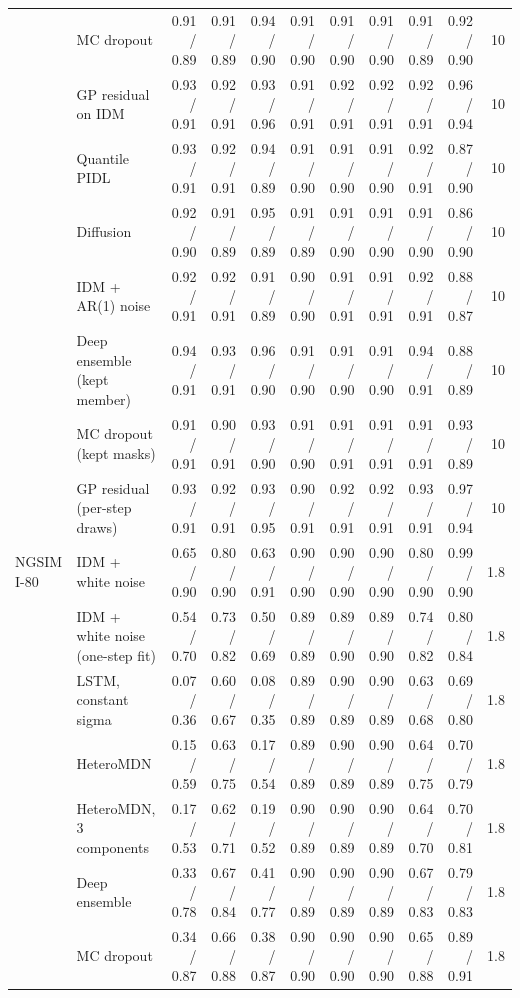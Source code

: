 \begin{longtable}{llrrrrrrrrr}
 & MC dropout & 0.91 / 0.89 & 0.91 / 0.89 & 0.94 / 0.90 & 0.91 / 0.90 & 0.91 / 0.90 & 0.91 / 0.90 & 0.91 / 0.89 & 0.92 / 0.90 & 10 \\
 & GP residual on IDM & 0.93 / 0.91 & 0.92 / 0.91 & 0.93 / 0.96 & 0.91 / 0.91 & 0.92 / 0.91 & 0.92 / 0.91 & 0.92 / 0.91 & 0.96 / 0.94 & 10 \\
 & Quantile PIDL & 0.93 / 0.91 & 0.92 / 0.91 & 0.94 / 0.89 & 0.91 / 0.90 & 0.91 / 0.90 & 0.91 / 0.90 & 0.92 / 0.91 & 0.87 / 0.90 & 10 \\
 & Diffusion & 0.92 / 0.90 & 0.91 / 0.89 & 0.95 / 0.89 & 0.91 / 0.89 & 0.91 / 0.90 & 0.91 / 0.90 & 0.91 / 0.90 & 0.86 / 0.90 & 10 \\
 & IDM + AR(1) noise & 0.92 / 0.91 & 0.92 / 0.91 & 0.91 / 0.89 & 0.90 / 0.90 & 0.91 / 0.91 & 0.91 / 0.91 & 0.92 / 0.91 & 0.88 / 0.87 & 10 \\
 & Deep ensemble (kept member) & 0.94 / 0.91 & 0.93 / 0.91 & 0.96 / 0.90 & 0.91 / 0.90 & 0.91 / 0.90 & 0.91 / 0.90 & 0.94 / 0.91 & 0.88 / 0.89 & 10 \\
 & MC dropout (kept masks) & 0.91 / 0.91 & 0.90 / 0.91 & 0.93 / 0.90 & 0.91 / 0.90 & 0.91 / 0.91 & 0.91 / 0.91 & 0.91 / 0.91 & 0.93 / 0.89 & 10 \\
 & GP residual (per-step draws) & 0.93 / 0.91 & 0.92 / 0.91 & 0.93 / 0.95 & 0.90 / 0.91 & 0.92 / 0.91 & 0.92 / 0.91 & 0.93 / 0.91 & 0.97 / 0.94 & 10 \\
\midrule
NGSIM I-80 & IDM + white noise & 0.65 / 0.90 & 0.80 / 0.90 & 0.63 / 0.91 & 0.90 / 0.90 & 0.90 / 0.90 & 0.90 / 0.90 & 0.80 / 0.90 & 0.99 / 0.90 & 1.8 \\
 & IDM + white noise (one-step fit) & 0.54 / 0.70 & 0.73 / 0.82 & 0.50 / 0.69 & 0.89 / 0.89 & 0.89 / 0.90 & 0.89 / 0.90 & 0.74 / 0.82 & 0.80 / 0.84 & 1.8 \\
 & LSTM, constant sigma & 0.07 / 0.36 & 0.60 / 0.67 & 0.08 / 0.35 & 0.89 / 0.89 & 0.90 / 0.89 & 0.90 / 0.89 & 0.63 / 0.68 & 0.69 / 0.80 & 1.8 \\
 & HeteroMDN & 0.15 / 0.59 & 0.63 / 0.75 & 0.17 / 0.54 & 0.89 / 0.89 & 0.90 / 0.89 & 0.90 / 0.89 & 0.64 / 0.75 & 0.70 / 0.79 & 1.8 \\
 & HeteroMDN, 3 components & 0.17 / 0.53 & 0.62 / 0.71 & 0.19 / 0.52 & 0.90 / 0.89 & 0.90 / 0.89 & 0.90 / 0.89 & 0.64 / 0.70 & 0.70 / 0.81 & 1.8 \\
 & Deep ensemble & 0.33 / 0.78 & 0.67 / 0.84 & 0.41 / 0.77 & 0.90 / 0.89 & 0.90 / 0.89 & 0.90 / 0.89 & 0.67 / 0.83 & 0.79 / 0.83 & 1.8 \\
 & MC dropout & 0.34 / 0.87 & 0.66 / 0.88 & 0.38 / 0.87 & 0.90 / 0.90 & 0.90 / 0.90 & 0.90 / 0.90 & 0.65 / 0.88 & 0.89 / 0.91 & 1.8 \\

\end{longtable}
